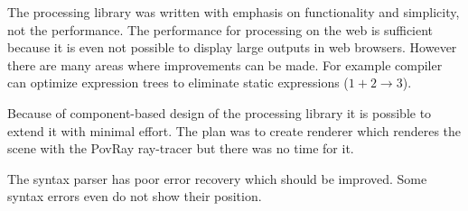 The \lsystem processing library was written with emphasis on functionality and simplicity, not the performance.
The performance for processing \lsystem on the web is sufficient because it is even not possible to display large outputs in web browsers.
However there are many areas where improvements can be made.
For example compiler can optimize expression trees to eliminate static expressions ($1 + 2 \rightarrow 3$).

Because of component-based design of the \lsystem processing library it is possible to extend it with minimal effort.
The plan was to create renderer which renderes the scene with the PovRay ray-tracer but there was no time for it.

The syntax parser has poor error recovery which should be improved.
Some syntax errors even do not show their position.































